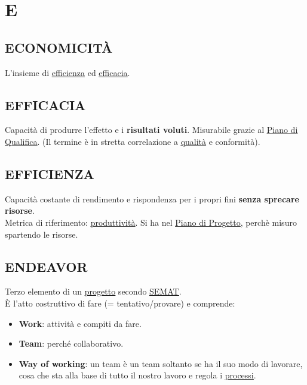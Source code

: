 \newpage
	\section{E} \label{sec:E}

		\subsection{ECONOMICITÀ}  \label{economicita}
		L'insieme di \underline{\hyperref[efficienza]{efficienza}} ed \underline{\hyperref[efficacia]{efficacia}}.

		\subsection{EFFICACIA}  \label{efficacia}
		Capacità di produrre l'effetto e i \textbf{risultati voluti}. Misurabile grazie al \underline{\hyperref[pianoqualifica]{Piano di Qualifica}}. (Il termine è in stretta correlazione a \underline{\hyperref[qualita]{qualità}} e conformità).


		\subsection{EFFICIENZA}  \label{efficienza}
		Capacità costante di rendimento e rispondenza per i propri fini \textbf{senza sprecare risorse}. \\
		Metrica di riferimento: \underline{\hyperref[produttivita]{produttività}}.
		Si ha nel \underline{\hyperref[piano]{Piano di Progetto}}, perchè misuro spartendo le risorse.

		\subsection{ENDEAVOR}  \label{endeavor}
		Terzo elemento di un \underline{\hyperref[progetto]{progetto}}  secondo \underline{\hyperref[semat]{SEMAT}}. \\
		È l'atto costruttivo di fare (= tentativo/provare) e comprende:
		\begin{itemize}
			\item \textbf{Work}: attività e compiti da fare. \label{work}
			\item \textbf{Team}: perché collaborativo. \label{team}
			\item \textbf{Way of working}: un team è un team soltanto se ha il suo modo di lavorare, cosa che sta alla base di tutto il nostro lavoro e regola i \underline{\hyperref[processo]{processi}}. \label{way}
		\end{itemize}


